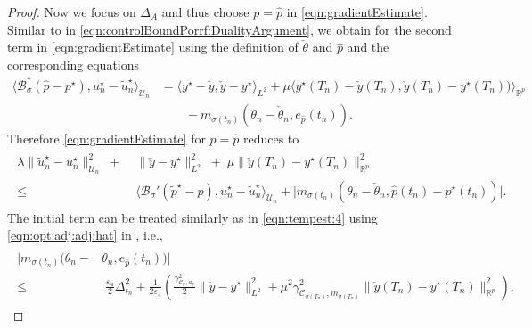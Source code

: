 \documentclass[reqno]{amsart}
\newcommand{\U}{{\mathscr U}}
\newcommand{\R}{\mathbb R}
\newcommand{\state}{\theta}
\newcommand{\adState}{p}
\newcommand{\inpVar}{u}
\newcommand{\outVar}{y}
\newcommand{\outVarDim}{p}
\newcommand{\bOper}{\calB}
\newcommand{\cOper}{\calC}
\newcommand{\initBound}{\initBoundn{n}}%
\newcommand{\initBoundn}[1]{\Delta_{t_{#1}}}
\newcommand{\intermediateInitState}{\intermediateState_n}%
\newcommand{\optAdState}{\adState^\star}
\newcommand{\optInpVar}[1]{\inpVar_{#1}^\star}
\newcommand{\optInpVarN}{\optInpVar{n}}
\newcommand{\optOutVar}{\outVar^\star}
\newcommand{\switch}{\sigma}
\newcommand{\reduce}[1]{\tilde{#1}}
\newcommand{\BoundControlA}{\Delta_{A}}
\newcommand{\adStateRed}{\reduce{\adState}}
\newcommand{\optAdStateRed}{\adStateRed^\star}
\newcommand{\optInpVarRed}[1]{\reduce{\inpVar}_{#1}^\star}
\newcommand{\optInpVarRedN}{\optInpVarRed{n}}
\newcommand{\intermediateState}{\check{\state}}
\newcommand{\intermediateAdStateA}{{\hat \adState}}
\newcommand{\intermediateOutVar}{\check{\outVar}}
\newcommand{\calB}{\mathcal{B}}
\newcommand{\calC}{\mathcal{C}}
\begin{document}
\begin{proof}
    
    Now we focus on $\BoundControlA$ and thus choose $\adState=\intermediateAdStateA$ in \eqref{eqn:gradientEstimate}. Similar to in \eqref{eqn:controlBoundPorrf:DualityArgument}, we obtain for the second term in \eqref{eqn:gradientEstimate} using the definition of $\intermediateState$ and $\intermediateAdStateA$ and the corresponding equations
    \begin{equation*}
	\begin{aligned}
		\langle \bOper_{\switch}^*(\intermediateAdStateA-\optAdState), \optInpVarN-\optInpVarRedN \rangle_{\U_n} &=  \langle \optOutVar- \intermediateOutVar, \intermediateOutVar-\optOutVar\rangle_{L^2}+ \mu \langle \optOutVar(T_n) - \intermediateOutVar(T_n),\intermediateOutVar(T_n) - \optOutVar(T_n)\big)\rangle_{\R^{\outVarDim}} \\
   &\qquad- m_{\switch(t_n)}(\state_{n} - \intermediateInitState, e_{\intermediateAdStateA}(t_n)).
	\end{aligned}
	\end{equation*}
   Therefore \eqref{eqn:gradientEstimate} for $\adState=\intermediateAdStateA$ reduces to
    \begin{align} \label{eqn:optimalOutputBound2}
		\begin{aligned}
		\lambda \|\optInpVarRedN - \optInpVarN\|^2_{\U_n}\;+&\; \|\intermediateOutVar - \optOutVar\|_{L^2}^2 \;+\; \mu\|\intermediateOutVar(T_n) - \optOutVar(T_n)\|_{\R^{\outVarDim}}^2\\
  \leq &\; \langle \bOper_{\switch}'(\optAdStateRed - \intermediateAdStateA), \optInpVarN-\optInpVarRedN \rangle_{\U_n}
  +\big|m_{\switch(t_n)}(\state_{n} - \intermediateInitState, \intermediateAdStateA(t_n)-\optAdState(t_n))\big|.
		\end{aligned}
	\end{align}
    The initial term can be treated similarly as in \eqref{eqn:tempest:4} using \eqref{eqn:opt:adj:adj:hat} in , i.e.,
    \begin{align}        \label{eqn:tempest:6}
   \begin{aligned}
        \big| m_{\switch(t_n)}(\state_{n} -& \intermediateInitState, e_{\intermediateAdStateA}(t_n))\big|\\
        \leq &\; \tfrac{\varepsilon_4}{2}\initBound^2 + \tfrac{1}{2\varepsilon_4}\left(\tfrac{\gamma^2_{\cOper_{\switch},{a}_{\switch}} }{2}\|\intermediateOutVar - \optOutVar\|^2_{L^2}+\mu^2 \gamma^2_{\cOper_{\sigma(T_n)},m_{\switch(T_n)}} \| \intermediateOutVar(T_n) - \optOutVar(T_n)\|^2_{\R^{\outVarDim}}\right).

\end{aligned}
\end{align}
\end{proof}
\end{document}
